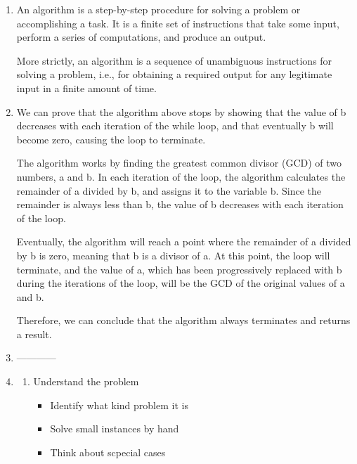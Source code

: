 \documentclass{article}
\begin{document}
\begin{enumerate}
    
    \item  An algorithm is a step-by-step procedure for solving a problem or accomplishing a task. It is a finite set of instructions that take some input, perform a series of computations, and produce an output.
    
    More strictly, an algorithm is a sequence of unambiguous instructions for solving a problem, i.e., for obtaining a required output for any legitimate input in a finite amount of time.
    
    \item 
    
    
    
    
    We can prove that the algorithm above stops by showing that the value of b decreases with each iteration of the while loop, and that eventually b will become zero, causing the loop to terminate.
    
    The algorithm works by finding the greatest common divisor (GCD) of two numbers, a and b. In each iteration of the loop, the algorithm calculates the remainder of a divided by b, and assigns it to the variable b. Since the remainder is always less than b, the value of b decreases with each iteration of the loop.
    
    Eventually, the algorithm will reach a point where the remainder of a divided by b is zero, meaning that b is a divisor of a. At this point, the loop will terminate, and the value of a, which has been progressively replaced with b during the iterations of the loop, will be the GCD of the original values of a and b.
    
    Therefore, we can conclude that the algorithm always terminates and returns a result.

    \item ------------
    
    \item  
    
    \begin{enumerate}
        \item Understand the problem 
        \begin{itemize}
            \item Identify what kind problem it is
            \item Solve small instances by hand 
            \item Think about scpecial cases
        \end{itemize}



\end{enumerate}
\end{enumerate}
\end{document}
